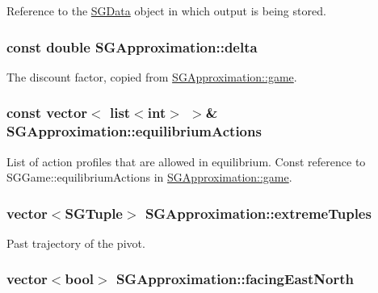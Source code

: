 Reference to the \hyperlink{class_s_g_data}{S\+G\+Data} object in which output is being stored. \hypertarget{class_s_g_approximation_a2db391ef9ba9edc0313ddfd627bf6d48}{
\subsubsection[{delta}]{\setlength{\rightskip}{0pt plus 5cm}const double S\+G\+Approximation\+::delta\hspace{0.3cm}{\ttfamily [private]}}}\label{class_s_g_approximation_a2db391ef9ba9edc0313ddfd627bf6d48}
The discount factor, copied from \hyperlink{class_s_g_approximation_a3244a3d7de5f2b909d438f5b4ab337ee}{S\+G\+Approximation\+::game}. \hypertarget{class_s_g_approximation_a1fffdb10af241d7c2e8591b661435c3d}{
\subsubsection[{equilibrium\+Actions}]{\setlength{\rightskip}{0pt plus 5cm}const vector$<$ list$<$int$>$ $>$\& S\+G\+Approximation\+::equilibrium\+Actions\hspace{0.3cm}{\ttfamily [private]}}}\label{class_s_g_approximation_a1fffdb10af241d7c2e8591b661435c3d}
List of action profiles that are allowed in equilibrium. Const reference to S\+G\+Game\+::equilibrium\+Actions in \hyperlink{class_s_g_approximation_a3244a3d7de5f2b909d438f5b4ab337ee}{S\+G\+Approximation\+::game}. \hypertarget{class_s_g_approximation_ac55fd302328ae8fbe4d1f8cf24a7ba32}{
\subsubsection[{extreme\+Tuples}]{\setlength{\rightskip}{0pt plus 5cm}vector$<${\bf S\+G\+Tuple}$>$ S\+G\+Approximation\+::extreme\+Tuples\hspace{0.3cm}{\ttfamily [private]}}}\label{class_s_g_approximation_ac55fd302328ae8fbe4d1f8cf24a7ba32}
Past trajectory of the pivot. \hypertarget{class_s_g_approximation_a35e422ed70d04b22ea8719cbc0f2fb6a}{
\subsubsection[{facing\+East\+North}]{\setlength{\rightskip}{0pt plus 5cm}vector$<$bool$>$ S\+G\+Approximation\+::facing\+East\+North\hspace{0.3cm}{\ttfamily [private]}}}\label{class_s_g_approximation_a35e422ed70d04b22ea8719cbc0f2fb6a}
